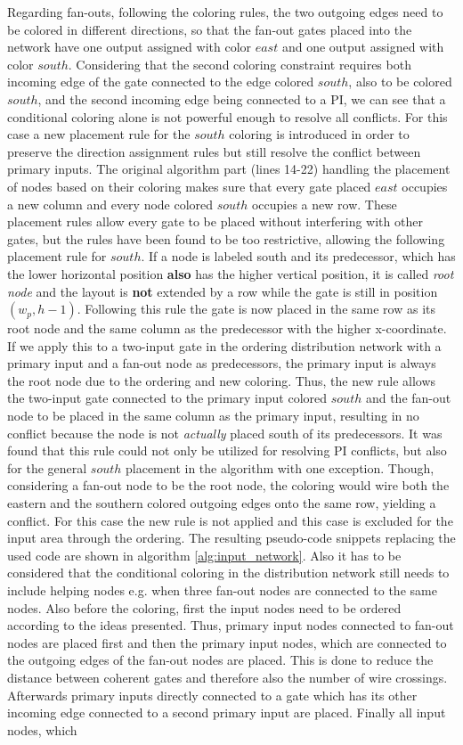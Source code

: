 Regarding fan-outs, following the coloring rules, the two outgoing edges need to be colored in different directions, so that the fan-out gates placed into the network have one output assigned with color $east$ and one output assigned with color $south$. Considering that the second coloring constraint requires both incoming edge of the gate connected to the edge colored $south$, also to be colored $south$, and the second incoming edge being connected to a PI, we can see that a conditional coloring alone is not powerful enough to resolve all conflicts. For this case a new placement rule for the $south$ coloring is introduced in order to preserve the direction assignment rules but still resolve the conflict between primary inputs. The original algorithm part (lines 14-22) handling the placement of nodes based on their coloring makes sure that every gate placed $east$ occupies a new column and every node colored $south$ occupies a new row. These placement rules allow every gate to be placed without interfering with other gates, but the rules have been found to be too restrictive, allowing the following placement rule for $south$. If a node is labeled south and its predecessor, which has the lower horizontal position \textbf{also} has the higher vertical position, it is called \textit{root node} and the layout is \textbf{not} extended by a row while the gate is still in position $(w_p, h-1)$. Following this rule the gate is now placed in the same row as its root node and the same column as the predecessor with the higher x-coordinate. If we apply this to a two-input gate in the ordering distribution network with a primary input and a fan-out node as predecessors, the primary input is always the root node due to the ordering and new coloring. Thus, the new rule allows the two-input gate connected to the primary input colored $south$ and the fan-out node to be placed in the same column as the primary input, resulting in no conflict because the node is not \textit{actually} placed south of its predecessors. It was found that this rule could not only be utilized for resolving PI conflicts, but also for the general $south$ placement in the algorithm with one exception. Though, considering a fan-out node to be the root node, the coloring would wire both the eastern and the southern colored outgoing edges onto the same row, yielding a conflict. For this case the new rule is not applied and this case is excluded for the input area through the ordering. The resulting pseudo-code snippets replacing the used code are shown in algorithm \ref{alg:input_network}. Also it has to be considered that the conditional coloring in the distribution network still needs to include helping nodes e.g. when three fan-out nodes are connected to the same nodes. Also before the coloring, first the input nodes need to be ordered according to the ideas presented. Thus, primary input nodes connected to fan-out nodes are placed first and then the primary input nodes, which are connected to the outgoing edges of the fan-out nodes are placed. This is done to reduce the distance between coherent gates and therefore also the number of wire crossings. Afterwards primary inputs directly connected to a gate which has its other incoming edge connected to a second primary input are placed. Finally all input nodes, which 